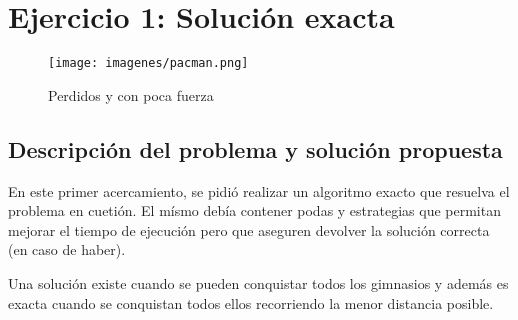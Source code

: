 \section{Ejercicio 1: Solución exacta}

  \begin{figure}[ht]
    \begin{center}
      \texttt{[image: imagenes/pacman.png]}
      \caption{Perdidos y con poca fuerza}
    \end{center}
  \end{figure}

    \subsection{Descripción del problema y solución propuesta}
        En este primer acercamiento, se pidió realizar un algoritmo exacto que resuelva el problema en cuetión. El mísmo debía contener podas y estrategias que permitan mejorar el tiempo de ejecución pero que aseguren devolver la solución correcta (en caso de haber).

        Una solución existe cuando se pueden conquistar todos los gimnasios y además es exacta cuando se conquistan todos ellos recorriendo la menor distancia posible.

